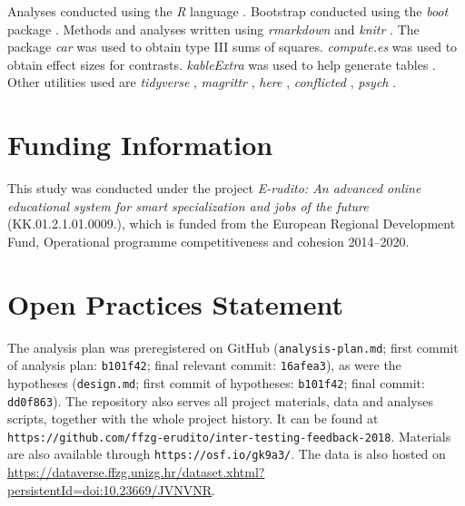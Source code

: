 \documentclass[12pt]{article}
\begin{document}
Analyses conducted using the \textit{R} language
\citep{rcoreteamLanguageEnvironmentStatistical2019}.
Bootstrap conducted using the \textit{boot} package
\citep{cantyBootBootstrapSPlus2017}. Methods and analyses written using
\textit{rmarkdown} \citep{allaireRmarkdownDynamicDocuments2019} and
\textit{knitr} \citep{xieKnitrGeneralPurposePackage2019}. The package
\textit{car} \citep{foxCompanionAppliedRegression2011} was used to
obtain type III sums of squares. \textit{compute.es}
\citep{reComputeEsCompute2013} was used to obtain effect sizes for
contrasts. \textit{kableExtra} was used to help generate tables
\citep{zhuKableExtraConstructComplex2019}. Other utilities used are
\textit{tidyverse} \citep{wickhamTidyverseEasilyInstall2017},
\textit{magrittr} \citep{bacheMagrittrForwardPipeOperator2014},
\textit{here} \citep{mullerHereSimplerWay2017}, \textit{conflicted}
\citep{wickhamConflictedAlternativeConflict2018}, \textit{psych}
\citep{revellePsychProceduresPsychological2018}.

\clearpage

\section{Funding Information}

This study was conducted under the project \textit{E-rudito: An
advanced online educational system for smart specialization and jobs of the
future} (KK.01.2.1.01.0009.), which is funded from the European Regional
Development Fund, Operational programme competitiveness and cohesion 2014--2020.

\section{Open Practices Statement}

The analysis plan was preregistered on GitHub (\texttt{analysis-plan.md};
first commit of analysis plan: \texttt{b101f42}; final relevant commit:
\texttt{16afea3}), as were the hypotheses (\texttt{design.md}; first commit of hypotheses:
\texttt{b101f42}; final commit: \texttt{dd0f863}).  The repository also serves all
project materials, data and analyses scripts, together with the whole project
history. It can be found at
\texttt{https://github.com/ffzg-erudito/inter-testing-feedback-2018}.
Materials are also available through \texttt{https://osf.io/gk9a3/}. The data
is also hosted on
\url{https://dataverse.ffzg.unizg.hr/dataset.xhtml?persistentId=doi:10.23669/JVNVNR}.

{}


\end{document}
